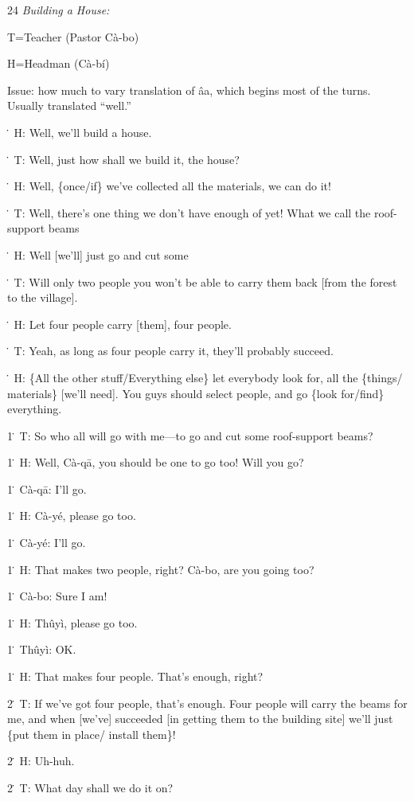
24\textit{ Building a House:}

T=Teacher (Pastor Cà-bo)

H=Headman (Cà-bí)

Issue: how much to vary translation of âa, which begins most of the turns.  Usually
translated ``well.''

\. H: Well, we'll build a house.

\. T: Well, just how shall we build it, the house?

\. H: Well, \{once/if\} we've collected all the materials, we can do it!

\. T: Well, there's one thing we don't have enough of yet!  What we call the roof-support
beams

\. H: Well [we'll] just go and cut some

\. T: Will only two people you won't be able to carry them back [from the forest
to the village].

\. H: Let four people carry [them], four people.

\. T: Yeah, as long as four people carry it, they'll probably succeed.

\. H: \{All the other stuff/Everything else\} let everybody look for, all the \{things/
materials\} [we'll need].  You guys should select people, and go \{look for/find\}
everything.

1\. T: So who all will go with me---to go and cut some roof-support beams?

1\. H: Well, Cà-qā, you should be one to go too!  Will you go?

1\. Cà-qā: I'll go.

1\. H: Cà-yé, please go too.

1\. Cà-yé: I'll go.

1\. H: That makes two people, right? Cà-bo, are you going too?

1\. Cà-bo: Sure I am!

1\. H: Thûyì, please go too.

1\. Thûyì: OK.

1\. H: That makes four people.  That's enough, right?

2\. T: If we've got four people, that's enough.  Four people will carry the beams
for me, and when [we've] succeeded [in getting them to the building site] we'll
just \{put them in place/ install them\}!

2\. H: Uh-huh.

2\. T: What day shall we do it on?

